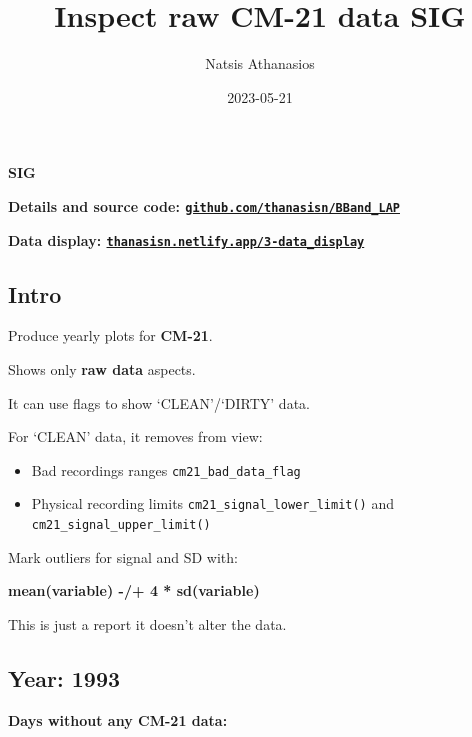 \documentclass[
  10pt,
  a4paper,oneside]{article}
\title{Inspect raw CM-21 data \textbf{SIG}}
\author{Natsis Athanasios}
\date{2023-05-21}
\providecommand{\tightlist}{%
  \setlength{\itemsep}{0pt}\setlength{\parskip}{0pt}}
\begin{document}
\maketitle

{
\hypersetup{linkcolor=}
\setcounter{tocdepth}{4}
\tableofcontents
}
\textbf{SIG}

\textbf{Details and source code: \href{https://github.com/thanasisn/BBand_LAP}{\texttt{github.com/thanasisn/BBand\_LAP}}}

\textbf{Data display: \href{https://thanasisn.netlify.app/3-data_display}{\texttt{thanasisn.netlify.app/3-data\_display}}}

\hypertarget{intro}{%
\subsection{Intro}\label{intro}}

Produce yearly plots for \textbf{CM-21}.

Shows only \textbf{raw data} aspects.

It can use flags to show `CLEAN'/`DIRTY' data.

For `CLEAN' data, it removes from view:

\begin{itemize}
\tightlist
\item
  Bad recordings ranges \texttt{cm21\_bad\_data\_flag}
\item
  Physical recording limits \texttt{cm21\_signal\_lower\_limit()} and \texttt{cm21\_signal\_upper\_limit()}
\end{itemize}

Mark outliers for signal and SD with:

\textbf{mean(variable) -/+ 4 * sd(variable)}

This is just a report it doesn't alter the data.

\FloatBarrier

\newpage

\hypertarget{year-1993}{%
\subsection{Year: 1993}\label{year-1993}}

\textbf{Days without any CM-21 data:}
\end{document}
